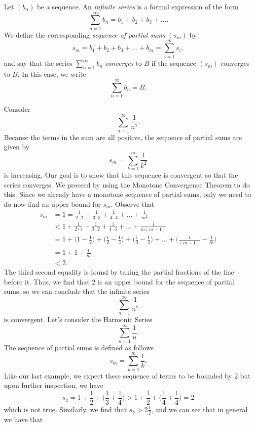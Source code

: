 \begin{definition}
        Let \( (b_n)\) be a sequence. An \textit{infinite series} is a formal expression of the form 
        \[ \sum_{n=1}^{ \infty} b_n = b_1 + b_2 + b_3 + \dots { }. \]
        We define the corresponding \textit{sequence of partial sums} \( (s_m)\) by 
        \[ s_m = b_1 + b_2 + b_3 + ... + b_m = \sum_{i=1}^{m} s_i,\]
        and say that the series \( \sum_{n=1}^{ \infty} b_n \) \textit{converges} to \( B \) if the sequence \( (s_m)\) converges to \( B \). In this case, we write 
        \[ \sum_{n=1}^{ \infty} b_n = B.\]
\end{definition}

Consider 
\[ \sum_{n=1}^{ \infty} \frac{1}{n^2}.\]
Because the terms in the sum are all positive, the sequence of partial sums are given by 
\[ s_m = \sum_{k = 1}^{ m} \frac{1}{k^2}\]
is increasing. Our goal is to show that this sequence is convergent so that the series converges. We proceed by using the Monotone Convergence Theorem to do this. Since we already have a monotone sequence of partial sums, only we need to do now find an upper bound for \( s_m \). Observe that  
\begin{align*}
s_m &= 1 = \frac{1}{2 \cdot 2} + \frac{1}{3 \cdot 3} + \frac{1}{4 \cdot 4} + ... + \frac{1}{m^2} \\
    &< 1 + \frac{1}{2 \cdot 1} + \frac{1}{3 \cdot 2} + \frac{1}{4 \cdot 3} + ... + \frac{1}{m(m-1)} \\
    &= 1 + \Big(  1 - \frac{1}{2}\Big) + \Big( \frac{1}{2} - \frac{1}{3} \Big) + \Big( \frac{1}{3} - \frac{1}{4} \Big) + ... + \Big( \frac{1}{(m-1)} - \frac{1}{m} \Big) \\
    &= 1 + 1 - \frac{1}{m} \\
    &< 2. 
\end{align*}
The third second equality is found by taking the partial fractions of the line before it.
Thus, we find that \( 2 \) is an upper bound for the sequence of partial sums, so we can conclude that the infinite series 
\[ \sum_{n=1}^{ \infty} \frac{1}{n^2} \]
is convergent.
    Let's consider the Harmonic Series 
    \[ \sum_{n=1}^{ \infty} \frac{1}{n}. \]
    The sequence of partial sums is defined as follows
    \[ s_m = \sum_{k=1}^{m} \frac{1}{k}.\]
    Like our last example, we expect these sequence of terms to be bounded by 2 but upon further inspection, we have 
    \[ s_4 = 1  + \frac{1}{2} + \Big( \frac{1}{3} + \frac{1}{4} \Big) > 1 + \frac{1}{2} + \Big( \frac{1}{4}+ \frac{1}{4} \Big) = 2\]
    which is not true. Similarly, we find that \( s_8 > 2 \frac{1}{2}\), and we can see that in general we have that 
